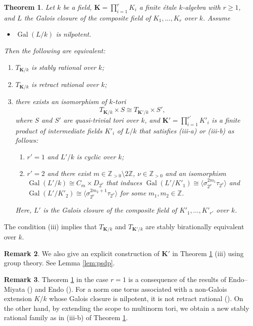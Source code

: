 \documentclass[12pt]{amsart}
\theoremstyle{plain}
\newtheorem{thm}{Theorem}[section]
\theoremstyle{definition}
\newtheorem{rem}[thm]{Remark}
\numberwithin{thm}{section}
\numberwithin{equation}{section}
\newcommand{\Zpn}{\mathbb{Z}_{>0}}
\newcommand{\Z}{\mathbb{Z}}
\newcommand{\bK}{\mathbf{K}}
\DeclareMathOperator{\Gal}{Gal}
\begin{document}
\begin{thm}\label{mth3}
Let $k$ be a field, $\bK=\prod_{i=1}^{r}K_{i}$ a finite {\'e}tale $k$-algebra with $r\geq 1$, and $L$ the Galois closure of the composite field of $K_{1},\ldots,K_{r}$ over $k$. 
Assume
\begin{itemize}
\item $\Gal(L/k)$ is nilpotent.
\end{itemize}
Then the following are equivalent:
\begin{enumerate}
\item $T_{\bK/k}$ is stably rational over $k$; 
\item $T_{\bK/k}$ is retract rational over $k$; 
\item there exists an isomorphism of $k$-tori
\begin{equation*}
    T_{\bK/k}\times S\cong T_{\bK'/k}\times S',
\end{equation*}
where $S$ and $S'$ are quasi-trivial tori over $k$, and $\bK'=\prod_{i=1}^{r'}K'_{i}$ is a finite product of intermediate fields $K'_{i}$ of $L/k$ that satisfies \emph{(iii-a)} or \emph{(iii-b)} as follows:
\begin{enumerate}
    \item[(iii-a)] $r'=1$ and $L'/k$ is cyclic over $k$; 
    \item[(iii-b)] $r'=2$ and there exist $m\in \Zpn \setminus 2\Z$, $\nu \in \Zpn$ and an isomorphism $\Gal(L'/k)\cong C_{m}\times D_{2^{\nu}}$ that induces $\Gal(L'/K'_{1})\cong \langle \sigma_{2^{\nu}}^{2m_{1}}\tau_{2^{\nu}}\rangle$ and $\Gal(L'/K'_{2})\cong \langle \sigma_{2^{\nu}}^{2m_{2}+1}\tau_{2^{\nu}}\rangle$ for some $m_{1},m_{2}\in \Z$.
\end{enumerate}
Here, $L'$ is the Galois closure of the composite field of $K'_{1},\ldots,K'_{r'}$ over $k$. 
\end{enumerate}
\end{thm}

The condition (iii) implies that $T_{\bK/k}$ and $T_{\bK'/k}$ are stably birationally equivalent over $k$. 

\begin{rem}
We also give an explicit construction of $\bK'$ in Theorem \ref{mth3} (iii) using group theory. See Lemma \ref{lem:psdp}. 
\end{rem}

\begin{rem}
Theorem \ref{mth3} in the case $r=1$ is a consequence of the results of Endo--Miyata (\cite[Theorem 1.5, Theorem 2.3]{Endo1975}) and Endo (\cite[Theorem 2.1]{Endo2011}). 
For a norm one torus associated with a non-Galois extension $K/k$ whose Galois closure is nilpotent, it is not retract rational (\cite[Theorem 2.1]{Endo2011}).
On the other hand, by extending the scope to multinorm tori, we obtain a new stably rational family as in (iii-b) of Theorem \ref{mth3}.
\end{rem}
\end{document}
